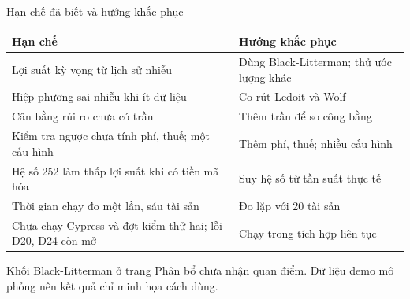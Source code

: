 \documentclass[aspectratio=169,10pt]{beamer}
\begin{document}
\begin{frame}[t]{Hạn chế đã biết và hướng khắc phục}
  \centering
  \begin{tabular}{@{}L{6.4cm}L{6.2cm}@{}}
    \toprule
    \textbf{Hạn chế} & \textbf{Hướng khắc phục} \\
    \midrule
    Lợi suất kỳ vọng từ lịch sử nhiễu & Dùng Black-Litterman; thử ước lượng khác \\
    Hiệp phương sai nhiễu khi ít dữ liệu & Co rút Ledoit và Wolf \cite{ledoit} \\
    Cân bằng rủi ro chưa có trần & Thêm trần để so công bằng \\
    Kiểm tra ngược chưa tính phí, thuế; một cấu hình & Thêm phí, thuế; nhiều cấu hình \\
    Hệ số 252 làm thấp lợi suất khi có tiền mã hóa & Suy hệ số từ tần suất thực tế \\
    Thời gian chạy đo một lần, sáu tài sản & Đo lặp với 20 tài sản \\
    Chưa chạy Cypress và đợt kiểm thử hai; lỗi D20, D24 còn mở & Chạy trong tích hợp liên tục \\
    \bottomrule
  \end{tabular}

  \vspace{4pt}
  Khối Black-Litterman ở trang Phân bổ chưa nhận quan điểm. Dữ liệu demo mô phỏng nên kết quả chỉ minh họa cách dùng.
\end{frame}
\end{document}
